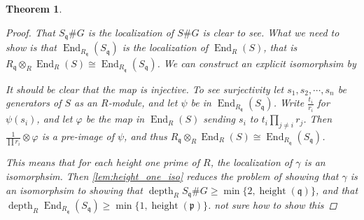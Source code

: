 \documentclass[11pt, a4paper, english]{article}
\numberwithin{prop}{section}
\numberwithin{lemma}{section}
\newtheorem{theorem}{Theorem}
\numberwithin{theorem}{section}
\numberwithin{defin}{section}
\numberwithin{example}{section}
\DeclareMathOperator{\End}{End}
\DeclareMathOperator{\depth}{depth}
\DeclareMathOperator{\height}{height}
\begin{document}
\begin{theorem}
\begin{proof}
That $S_\mathfrak{q} \# G$ is the localization of $S\#G$ is clear to see. What we need to show is that $\End_{R_\mathfrak{q}}(S_\mathfrak{q})$ is the localization of $\End_R(S)$, that is $R_\mathfrak{q} \otimes_R \End_R(S) \cong \End_{R_\mathfrak{q}}(S_\mathfrak{q})$. We can construct an explicit isomorphsim by
\begin{center}
\end{center}
It should be clear that the map is injective. To see surjectivity let $s_1, s_2, \cdots, s_n$ be generators of $S$ as an $R$-module, and let $\psi$ be in $\End_{R_\mathfrak{q}}(S_\mathfrak{q})$. Write $\frac{t_i}{r_i}$ for $\psi(s_i)$, and let $\varphi$ be the map in $\End_R(S)$ sending $s_i$ to $t_i\prod_{j \neq i} r_j$. Then $\frac{1}{\prod r_i} \otimes \varphi$ is a pre-image of $\psi$, and thus $R_\mathfrak{q} \otimes_R \End_R(S) \cong \End_{R_\mathfrak{q}}(S_\mathfrak{q})$.

This means that for each height one prime of $R$, the localization of $\gamma$ is an isomorphsim. Then \cref{lem:height_one_iso} reduces the problem of showing that $\gamma$ is an isomorphsim to showing that $\depth_R S_\mathfrak{q}\#G \geq \min \{ 2, \height(\mathfrak{q}) \}$, and that $\depth_R \End_{R_\mathfrak{q}}(S_\mathfrak{q}) \geq \min \{ 1, \height(\mathfrak{p}) \}$.
{\color{red} not sure how to show this}

\iffalse
Firstly let's show that for a prime ideal $\mathfrak{p}$ we have that $S_\mathfrak{p}^G = R_\mathfrak{q}$ where $\mathfrak{q} = R \cap \mathfrak{p}$. Assume $\frac{s}{p} \in S_\mathfrak{p}^G$ is fixed by $G$. Consider the fraction
\begin{align*}
\frac{ \left( \prod_{g \neq 1} p^g \right) s}{\prod_g p^g}
\end{align*}
Since we have just multiplied by $\prod_{g \neq 1} p^g$ in the nominator and the denominator it still equals $\frac{s}{p}$. The bottom is obviously fixed by $g$, but why is it not in $\mathfrak{q}$??? 
{\color{red} How do I know $p^g$ is not in $\mathfrak{p}$ ???? You localize using the complement of the prime ideal right??} Then since the denominator is fixed and the fraction as a whole is fixed this implies that the nominator is fixed as well.

Secondly I want to show that $\End_R(S)_\mathfrak{p} = \End_{R_\mathfrak{q}}(S_\mathfrak{p})$. {\color{red} ???}

From here we just need to wrap everything together. Since $G$ does not contain any pseudoreflections we get from \cref{thm:unramified_pseudoreflections} that the map is an isomoprhism when localizing at any height one prime ideal. Then \cref{lem:height_one_iso} gives us that it's an isomophism {\color{red} need to show depth}.
\fi
\end{proof}
\end{theorem}
\end{document}
